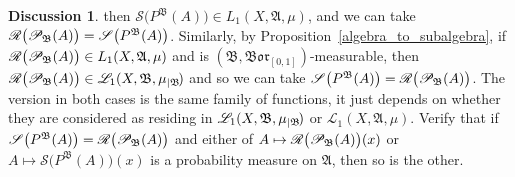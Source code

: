 \documentclass[
twoside=true,
paper=letter,
fontsize=11pt,
pagesize=auto,
leqno,
openany,
headsepline,
overfullrule,
]{scrbook}
\theoremstyle{plain}
\theoremstyle{plain}
\theoremstyle{definition}
\newtheorem{discussion}[thm]{Discussion}
\theoremstyle{bfnoteitalic}
\theoremstyle{bfnoteroman}
\newcommand{\sigalg}[1]{\mathfrak{#1}}
\newcommand{\cali}[1]{\mathscr{#1}}
\newcommand{\condprobop}[1]{\mathop{\cali{P}\hspace{-1pt}}\nolimits_{#1}}
\newcommand{\borel}{\mathfrak{Bor}}
\newcommand{\restrictedto}[1]{_{\lvert#1}\kern-1.5pt}
\newcommand{\sigmaalgebra}{\sigalg{A}}
\newcommand{\sigmaalgebraii}{\sigalg{B}}
\newcommand{\Lone}{L_1(\measurespace, \sigmaalgebra, \measure)}
\newcommand{\caliLone}{\cali{L}_1(\measurespace, \sigmaalgebra, \measure)}
\newcommand{\measurespace}{X}
\newcommand{\measure}{\mu}
\newcommand{\seti}{A}
\begin{document}
\begin{discussion}
then
$\cali{S} \bigl( P^\sigmaalgebraii(\seti) \bigr)
\in
\Lone$,
and we can take
$\cali{R}\bigl( \condprobop{\sigmaalgebraii}(\seti)\bigr)
=
\cali{S} \bigl( P^\sigmaalgebraii(\seti) \bigr)$.
Similarly, by Proposition~\ref{algebra_to_subalgebra}, if
$\cali{R}\bigl( \condprobop{\sigmaalgebraii}(\seti)\bigr)
\in
\Lone$ and
is $(\sigmaalgebraii,\borel_{[0,1]})$\hyp{}measurable,
then
$\cali{R}\bigl( \condprobop{\sigmaalgebraii}(\seti)\bigr)
\in
\cali{L}_1(\measurespace, \sigmaalgebraii,\measure\restrictedto{\sigmaalgebraii})$
and so we can take
$\cali{S} \bigl( P^\sigmaalgebraii(\seti) \bigr)
=
\cali{R}\bigl( \condprobop{\sigmaalgebraii}(\seti)\bigr)$.
The version in both cases is the same family of functions, it just depends on whether they are considered as residing in
$\cali{L}_1(\measurespace, \sigmaalgebraii,\measure\restrictedto{\sigmaalgebraii})$
or
$\caliLone$.
Verify that if
$\cali{S} \bigl( P^\sigmaalgebraii(\seti) \bigr)
=
\cali{R}\bigl( \condprobop{\sigmaalgebraii}(\seti)\bigr)$
and either of
$\seti\mapsto \cali{R}\bigl( \condprobop{\sigmaalgebraii}(\seti)\bigr)(x)$
or
$\seti\mapsto \cali{S} \bigl( P^\sigmaalgebraii(\seti) \bigr)(x)$
is a probability measure on $\sigmaalgebra$, then so is the other.
\end{discussion}
\end{document}
